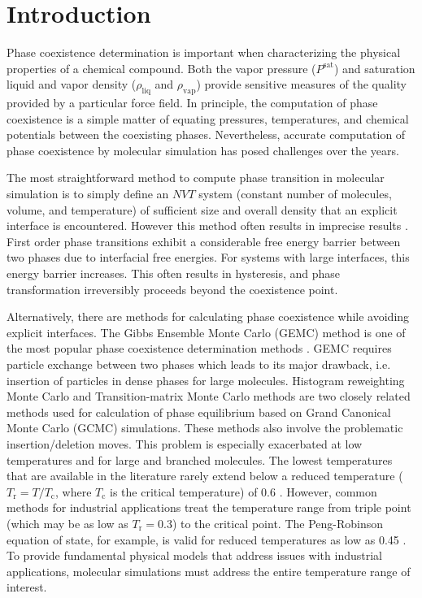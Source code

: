 \documentclass[5p,times]{elsarticle}
\begin{document}

\section{Introduction} \label{sec:introduction}
Phase coexistence determination is important when characterizing the physical properties of a chemical compound. Both the vapor pressure ($P^{\mathrm{sat}}$) and saturation liquid and vapor density ($\rho_{\mathrm{liq}}$ and $\rho_{\mathrm{vap}}$) provide sensitive measures of the quality provided by a particular force field. In principle, the computation of phase coexistence is a simple matter of equating pressures, temperatures, and chemical potentials between the coexisting phases. Nevertheless, accurate computation of phase coexistence by molecular simulation has posed challenges over the years. 

The most straightforward method to compute phase transition in molecular simulation is to simply define an $NVT$ system (constant number of molecules, volume, and temperature) of sufficient size and overall density that an explicit interface is encountered. However this method often results in imprecise results \cite{Frenkel1996}. First order phase transitions exhibit a considerable free energy barrier between two phases due to interfacial free energies. For systems with large interfaces, this energy barrier increases. This often results in hysteresis, and phase transformation irreversibly proceeds beyond the coexistence point. \cite{Frenkel1996} 

Alternatively, there are methods for calculating phase coexistence while avoiding explicit interfaces. The Gibbs Ensemble Monte Carlo (GEMC) method \cite{Panagiotopoulos1987} is one of the most popular phase coexistence determination methods \cite{Paluch2008}.  GEMC requires particle exchange between two phases which leads to its major drawback, i.e. insertion of particles in dense phases for large molecules. Histogram reweighting Monte Carlo and Transition-matrix Monte Carlo methods 
are two closely related methods used for calculation of phase equilibrium based on Grand Canonical Monte Carlo (GCMC) simulations. These methods also involve the problematic insertion/deletion moves. This problem is especially exacerbated  at low temperatures and for large and branched molecules. The lowest temperatures that are available in the literature rarely extend below a reduced temperature ($T_\mathrm{r} = T/T_\mathrm{c}$, where $T_\mathrm{c}$ is the critical temperature) of 0.6 \cite{Martin1998,Potoff2009}. However, common methods for industrial applications treat the temperature range from triple point (which may be as low as $T_\mathrm{r}=0.3$) to the critical point. The Peng-Robinson equation of state, for example, is valid for reduced temperatures as low as 0.45 \cite{Peng1976}. To provide fundamental physical models that address issues with industrial applications, molecular simulations must address the entire temperature range of interest. 
\end{document}
